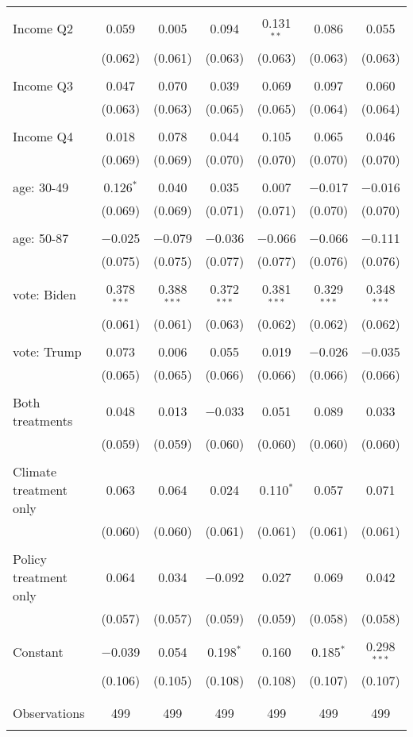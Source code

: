 \begin{tabular}{@{\extracolsep{5pt}}lcccccc}
  & & & & & & \\ 
 Income Q2 & 0.059 & 0.005 & 0.094 & 0.131$^{**}$ & 0.086 & 0.055 \\ 
  & (0.062) & (0.061) & (0.063) & (0.063) & (0.063) & (0.063) \\ 
  & & & & & & \\ 
 Income Q3 & 0.047 & 0.070 & 0.039 & 0.069 & 0.097 & 0.060 \\ 
  & (0.063) & (0.063) & (0.065) & (0.065) & (0.064) & (0.064) \\ 
  & & & & & & \\ 
 Income Q4 & 0.018 & 0.078 & 0.044 & 0.105 & 0.065 & 0.046 \\ 
  & (0.069) & (0.069) & (0.070) & (0.070) & (0.070) & (0.070) \\ 
  & & & & & & \\ 
 age: 30-49 & 0.126$^{*}$ & 0.040 & 0.035 & 0.007 & $-$0.017 & $-$0.016 \\ 
  & (0.069) & (0.069) & (0.071) & (0.071) & (0.070) & (0.070) \\ 
  & & & & & & \\ 
 age: 50-87 & $-$0.025 & $-$0.079 & $-$0.036 & $-$0.066 & $-$0.066 & $-$0.111 \\ 
  & (0.075) & (0.075) & (0.077) & (0.077) & (0.076) & (0.076) \\ 
  & & & & & & \\ 
 vote: Biden & 0.378$^{***}$ & 0.388$^{***}$ & 0.372$^{***}$ & 0.381$^{***}$ & 0.329$^{***}$ & 0.348$^{***}$ \\ 
  & (0.061) & (0.061) & (0.063) & (0.062) & (0.062) & (0.062) \\ 
  & & & & & & \\ 
 vote: Trump & 0.073 & 0.006 & 0.055 & 0.019 & $-$0.026 & $-$0.035 \\ 
  & (0.065) & (0.065) & (0.066) & (0.066) & (0.066) & (0.066) \\ 
  & & & & & & \\ 
 Both treatments & 0.048 & 0.013 & $-$0.033 & 0.051 & 0.089 & 0.033 \\ 
  & (0.059) & (0.059) & (0.060) & (0.060) & (0.060) & (0.060) \\ 
  & & & & & & \\ 
 Climate treatment only & 0.063 & 0.064 & 0.024 & 0.110$^{*}$ & 0.057 & 0.071 \\ 
  & (0.060) & (0.060) & (0.061) & (0.061) & (0.061) & (0.061) \\ 
  & & & & & & \\ 
 Policy treatment only & 0.064 & 0.034 & $-$0.092 & 0.027 & 0.069 & 0.042 \\ 
  & (0.057) & (0.057) & (0.059) & (0.059) & (0.058) & (0.058) \\ 
  & & & & & & \\ 
 Constant & $-$0.039 & 0.054 & 0.198$^{*}$ & 0.160 & 0.185$^{*}$ & 0.298$^{***}$ \\ 
  & (0.106) & (0.105) & (0.108) & (0.108) & (0.107) & (0.107) \\ 
  & & & & & & \\ 
\hline \\[-1.8ex] 

Observations & 499 & 499 & 499 & 499 & 499 & 499 \\ 
\hline 
\hline \\[-1.8ex] 
\end{tabular} 